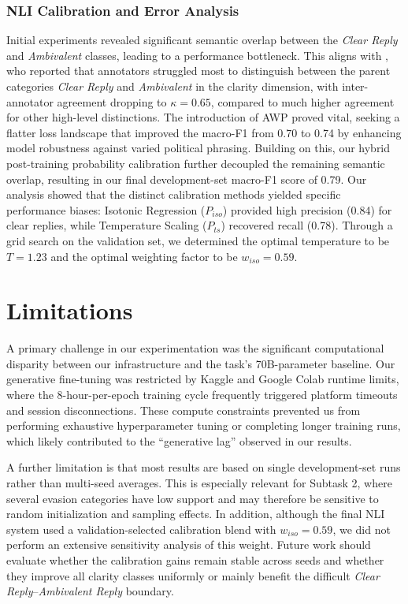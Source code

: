 \documentclass[11pt]{article}
\begin{document}
\subsubsection{NLI Calibration and Error Analysis}
Initial experiments revealed significant semantic overlap between the \textit{Clear Reply} and \textit{Ambivalent} classes, leading to a performance bottleneck. This aligns with \citet{b4}, who reported that annotators struggled most to distinguish between the parent categories \textit{Clear Reply} and \textit{Ambivalent} in the clarity dimension, with inter-annotator agreement dropping to $\kappa = 0.65$, compared to much higher agreement for other high-level distinctions. The introduction of AWP proved vital, seeking a flatter loss landscape that improved the macro-F1 from 0.70 to 0.74 by enhancing model robustness against varied political phrasing. Building on this, our hybrid post-training probability calibration further decoupled the remaining semantic overlap, resulting in our final development-set macro-F1 score of 0.79. Our analysis showed that the distinct calibration methods yielded specific performance biases: Isotonic Regression ($P_{iso}$) provided high precision (0.84) for clear replies, while Temperature Scaling ($P_{ts}$) recovered recall (0.78). Through a grid search on the validation set, we determined the optimal temperature to be $T = 1.23$ and the optimal weighting factor to be $w_{iso} = 0.59$. 

\section{Limitations}
A primary challenge in our experimentation was the significant computational disparity between our infrastructure and the task's 70B-parameter baseline. Our generative fine-tuning was restricted by Kaggle and Google Colab runtime limits, where the 8-hour-per-epoch training cycle frequently triggered platform timeouts and session disconnections. These compute constraints prevented us from performing exhaustive hyperparameter tuning or completing longer training runs, which likely contributed to the ``generative lag'' observed in our results.

A further limitation is that most results are based on single development-set runs rather than multi-seed averages. This is especially relevant for Subtask 2, where several evasion categories have low support and may therefore be sensitive to random initialization and sampling effects. In addition, although the final NLI system used a validation-selected calibration blend with $w_{iso}=0.59$, we did not perform an extensive sensitivity analysis of this weight. Future work should evaluate whether the calibration gains remain stable across seeds and whether they improve all clarity classes uniformly or mainly benefit the difficult \textit{Clear Reply}--\textit{Ambivalent Reply} boundary.
\end{document}
